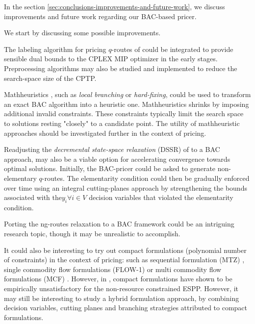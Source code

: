 In the section \cref{sec:conclusions-improvements-and-future-work}, we discuss improvements and future work regarding our BAC-based pricer.

We start by discussing some possible improvements.

The labeling algorithm for pricing $q$-routes of \textcite{desrochers1992} could be integrated to provide sensible dual bounds to the CPLEX MIP optimizer in the early stages.
Preprocessing algorithms may also be studied and implemented to reduce the search-space size of the CPTP.

Mathheuristics \parencite{fischetti2018}, such as \textit{local branching} \parencite{fischetti2003} or \textit{hard-fixing}, could be used to transform an exact BAC algorithm into a heuristic one.
Mathheuristics shrinks by imposing additional invalid constraints.
These constraints typically limit the search space to solutions resting "closely" to a candidate point.
The utility of mathheuristic approaches should be investigated further in the context of pricing.

Readjusting the \textit{decremental state-space relaxation} (DSSR) of \textcite{boland2006, righini2008, martinelli2014} to a BAC approach, may also be a viable option for accelerating convergence towards optimal solutions.
Initially, the BAC-pricer could be asked to generate non-elementary $q$-routes.
The elementarity condition could then be gradually enforced over time using an integral cutting-planes approach by strengthening the bounds associated with the$y_i \forall i \in V$ decision variables that violated the elementarity condition.

Porting the ng-routes relaxation \parencite{baldacci2011} to a BAC framework could be an intriguing research topic, though it may be unrealistic to accomplish.



It could also be interesting to try out compact formulations (polynomial number of constraints) in the context of pricing: such as sequential formulation (MTZ) \parencite{miller1960}, single commodity flow formulations (FLOW-1) \parencite{gavish1978travelling} or multi commodity flow formulations (MCF) \parencite{wong1980integer,claus1984new}.
However, in \textcite{taccari2016}, compact formulations have shown to be empirically unsatisfactory for the non-resource constrained ESPP.
However, it may still be interesting to study a hybrid formulation approach, by combining decision variables, cutting planes and branching strategies attributed to compact formulations.

